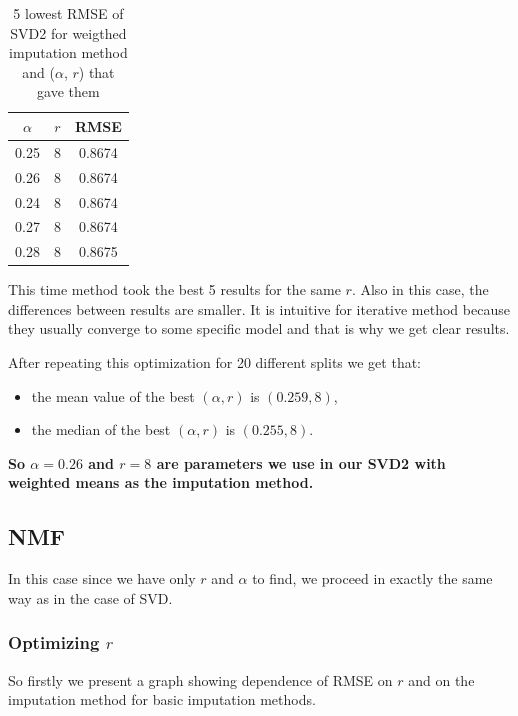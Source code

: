 \documentclass[10pt]{amsart}
\begin{document}
\begin{table}[H]
\begin{tabular}{cc|c}
$\alpha$ &  $r$ &     RMSE \\
\hline
       0.25 &  8 & 0.8674 \\
       0.26 &  8 & 0.8674 \\
       0.24 &  8 & 0.8674 \\
       0.27 &  8 & 0.8674 \\
       0.28 &  8 & 0.8675 \\
\end{tabular}
\caption{5 lowest RMSE of SVD2 for weigthed imputation method and ($\alpha$, $r$) that gave them}
\end{table}
This time method took the best 5 results for the same $r$.
Also in this case, the differences between results are smaller.
It is intuitive for iterative method because they usually converge to some specific model and that is why we get clear results.

After repeating this optimization for 20 different splits we get that:
\begin{itemize}
    \item the mean value of the best $(\alpha, r)$ is $(0.259, 8)$,
    \item the median of the best $(\alpha, r)$ is $(0.255, 8)$.
\end{itemize}
\textbf{So $\alpha = 0.26$ and $r=8$ are parameters we use in our SVD2 with weighted means as the imputation method.}

\subsection*{NMF}
In this case since we have only $r$ and $\alpha$ to find, we proceed in exactly the same way as in the case of SVD.

\subsubsection*{Optimizing $r$}
So firstly we present a graph showing dependence of RMSE on $r$ and on the imputation method for basic imputation methods.
\end{document}
